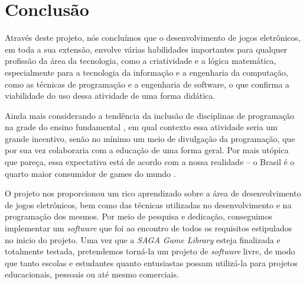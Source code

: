 \chapter{Conclusão}
\label{cap:conclusao}

Através deste projeto, nós concluímos que o desenvolvimento de jogos eletrônicos, em toda a sua extensão, envolve várias habilidades importantes para qualquer profissão da área da tecnologia, como a criatividade e a lógica matemática, especialmente para a tecnologia da informação e a engenharia da computação, como as técnicas de programação e a engenharia de software, o que confirma a viabilidade do uso dessa atividade de uma forma didática.

Ainda mais considerando a tendência da inclusão de disciplinas de programação na grade do ensino fundamental \nocite{OLHARDIG}, em qual contexto essa atividade seria um grande incentivo, senão no mínimo um meio de divulgação da programação, que por sua vez colaboraria com a educação de uma forma geral. Por mais utópica que pareça, essa expectativa está de acordo com a nossa realidade -- o Brasil é o quarto maior consumidor de games do mundo \nocite{ESTADAO}. 
\par 
O projeto nos proporcionou um rico aprendizado sobre a área de desenvolvimento de jogos eletrônicos, bem como das técnicas utilizadas no desenvolvimento e na programação dos mesmos. Por meio de pesquisa e dedicação, conseguimos implementar um \textit{software} que foi ao encontro de todos os requisitos estipulados no inicio do projeto. Uma vez que a \textit{SAGA Game Library} esteja finalizada e totalmente testada, pretendemos torná-la um projeto de \textit{software} livre, de modo que tanto escolas e estudantes quanto entusiastas possam utilizá-la para projetos educacionais, pessoais ou até mesmo comerciais.